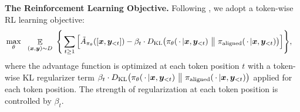 

\textbf{The Reinforcement Learning Objective.} Following \citet{mudgal2024controlled}, we adopt a token-wise RL learning objective:
\begin{align}
    & \max_{\theta} \ \ \mathop{\mathbb E}_{(\bm{x}, \bm{y}) \sim D} \  \Bigg\{ \sum_{t\ge 1} \Big[ \tilde{A}_{\pi_{\theta}}([\bm{x}, \bm{y}_{< t}]) - \beta_t \cdot D_{\text{KL}}\big(\pi_{\theta}(\,\cdot\, | \bm{x},  \bm{y}_{< t})~\big\|~\pi_{\mathrm{aligned}}(\,\cdot\, | \bm{x},  \bm{y}_{< t}) \big) \Big] \Bigg\},
\label{eqn:tokenwise-rl-objective}
\end{align}
where the advantage function is optimized at each token position $t$ with a token-wise KL regularizer term $\beta_t \cdot D_{\text{KL}}\big(\pi_{\theta}(\,\cdot\, | \bm{x},  \bm{y}_{< t})~\big\|~\pi_{\mathrm{aligned}}(\,\cdot\, | \bm{x},  \bm{y}_{< t}) \big)$ applied for each token position. The strength of regularization at each token position is controlled by $\beta_t$.


